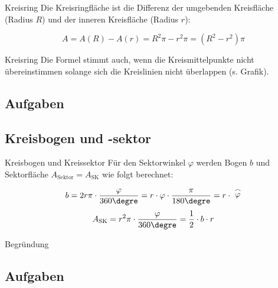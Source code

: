 
\begin{gesetz}{Kreisring}{}
  Die Kreisringfläche ist die Differenz der umgebenden Kreisfläche
  (Radius $R$) und
  der inneren Kreisfläche (Radius $r$):

  $$A = A(R) - A(r) = R^2\pi - r^2\pi = (R^2-r^2)\pi$$
\end{gesetz}

\begin{bemerkung}{Kreisring}{}
  Die Formel stimmt auch, wenn die Kreismittelpunkte nicht
  übereinstimmen solange sich die Kreislinien nicht überlappen (s. Grafik).
  \end{bemerkung}

\subsection*{Aufgaben}


\newpage


\subsection{Kreisbogen und -sektor}
\begin{gesetz}{Kreisbogen und
    Kreissektor}{}
  Für den Sektorwinkel $\varphi$ werden Bogen $b$ und Sektorfläche
  $A_{\text{Sektor}}=A_{\text{SK}}$ wie folgt berechnet:
  
  $$b = 2r\pi \cdot{}\frac{\varphi}{360\degre} = r\cdot{} \varphi
  \cdot{} \frac{\pi}{180\degre}= r\cdot{} \stackrel{\frown}{\varphi}$$
  $$A_{\text{SK}} = r^2\pi\cdot{}\frac{\varphi}{360\degre} = \frac12\cdot{}b\cdot{}r$$
\end{gesetz}


Begründung 

\subsection*{Aufgaben}

